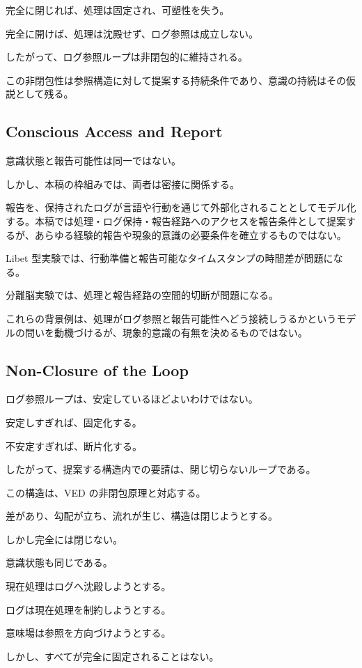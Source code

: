 完全に閉じれば、処理は固定され、可塑性を失う。

完全に開けば、処理は沈殿せず、ログ参照は成立しない。

したがって、ログ参照ループは非閉包的に維持される。

この非閉包性は参照構造に対して提案する持続条件であり、意識の持続はその仮説として残る。

\subsection{Conscious Access and Report}

意識状態と報告可能性は同一ではない。

しかし、本稿の枠組みでは、両者は密接に関係する。

報告を、保持されたログが言語や行動を通じて外部化されることとしてモデル化する。本稿では処理・ログ保持・報告経路へのアクセスを報告条件として提案するが、あらゆる経験的報告や現象的意識の必要条件を確立するものではない。

Libet 型実験では、行動準備と報告可能なタイムスタンプの時間差が問題になる。

分離脳実験では、処理と報告経路の空間的切断が問題になる。

これらの背景例は、処理がログ参照と報告可能性へどう接続しうるかというモデルの問いを動機づけるが、現象的意識の有無を決めるものではない。

\subsection{Non-Closure of the Loop}

ログ参照ループは、安定しているほどよいわけではない。

安定しすぎれば、固定化する。

不安定すぎれば、断片化する。

したがって、提案する構造内での要請は、閉じ切らないループである。

この構造は、VED の非閉包原理と対応する。

差があり、勾配が立ち、流れが生じ、構造は閉じようとする。

しかし完全には閉じない。

意識状態も同じである。

現在処理はログへ沈殿しようとする。

ログは現在処理を制約しようとする。

意味場は参照を方向づけようとする。

しかし、すべてが完全に固定されることはない。

